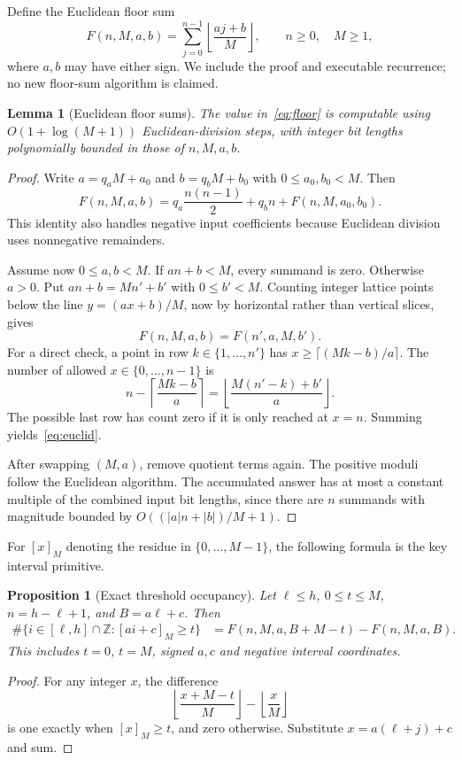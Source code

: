 \documentclass[11pt,letterpaper]{article}
\newtheorem{lemma}[theorem]{Lemma}
\newtheorem{proposition}[theorem]{Proposition}
\theoremstyle{definition}
\theoremstyle{remark}\newtheorem{remark}[theorem]{Remark}
\newcommand{\Z}{\mathbb Z}
\newcommand{\res}[2]{\left[#1\right]_{#2}}
\begin{document}
Define the Euclidean floor sum
\begin{equation}
 F(n,M,a,b)=\sum_{j=0}^{n-1}\left\lfloor\frac{aj+b}{M}\right\rfloor,
 \qquad n\geq0,\quad M\geq1,
 \label{eq:floor}
\end{equation}
where $a,b$ may have either sign. We include the proof and executable recurrence; no new floor-sum algorithm is claimed.

\begin{lemma}[Euclidean floor sums]
\label{lem:floor}
The value in~\eqref{eq:floor} is computable using $O(1+\log(M+1))$ Euclidean-division steps, with integer bit lengths polynomially bounded in those of $n,M,a,b$.
\end{lemma}
\begin{proof}
Write $a=q_aM+a_0$ and $b=q_bM+b_0$ with $0\leq a_0,b_0<M$. Then
\[
 F(n,M,a,b)=q_a\frac{n(n-1)}2+q_b n+F(n,M,a_0,b_0).
\]
This identity also handles negative input coefficients because Euclidean division uses nonnegative remainders.

Assume now $0\leq a,b<M$. If $an+b<M$, every summand is zero. Otherwise $a>0$. Put $an+b=Mn'+b'$ with $0\leq b'<M$. Counting integer lattice points below the line $y=(ax+b)/M$, now by horizontal rather than vertical slices, gives
\begin{equation}
                      F(n,M,a,b)=F(n',a,M,b').
 \label{eq:euclid}
\end{equation}
For a direct check, a point in row $k\in\{1,\ldots,n'\}$ has $x\geq\lceil(Mk-b)/a\rceil$. The number of allowed $x\in\{0,\ldots,n-1\}$ is
\[
 n-\left\lceil\frac{Mk-b}{a}\right\rceil
   =\left\lfloor\frac{M(n'-k)+b'}{a}\right\rfloor.
\]
The possible last row has count zero if it is only reached at $x=n$. Summing yields~\eqref{eq:euclid}.

After swapping $(M,a)$, remove quotient terms again. The positive moduli follow the Euclidean algorithm. The accumulated answer has at most a constant multiple of the combined input bit lengths, since there are $n$ summands with magnitude bounded by $O((|a|n+|b|)/M+1)$.
\end{proof}

For $\res{x}{M}$ denoting the residue in $\{0,\ldots,M-1\}$, the following formula is the key interval primitive.

\begin{proposition}[Exact threshold occupancy]
\label{prop:residue}
Let $\ell\leq h$, $0\leq t\leq M$, $n=h-\ell+1$, and $B=a\ell+c$. Then
\begin{align}
 \#\{i\in[\ell,h]\cap\Z:\res{ai+c}{M}\geq t\}
  &=F(n,M,a,B+M-t)-F(n,M,a,B).
 \label{eq:count}
\end{align}
This includes $t=0$, $t=M$, signed $a,c$ and negative interval coordinates.
\end{proposition}
\begin{proof}
For any integer $x$, the difference
\[
 \left\lfloor\frac{x+M-t}{M}\right\rfloor
       -\left\lfloor\frac{x}{M}\right\rfloor
\]
is one exactly when $\res{x}{M}\geq t$, and zero otherwise. Substitute $x=a(\ell+j)+c$ and sum.
\end{proof}
\end{document}
